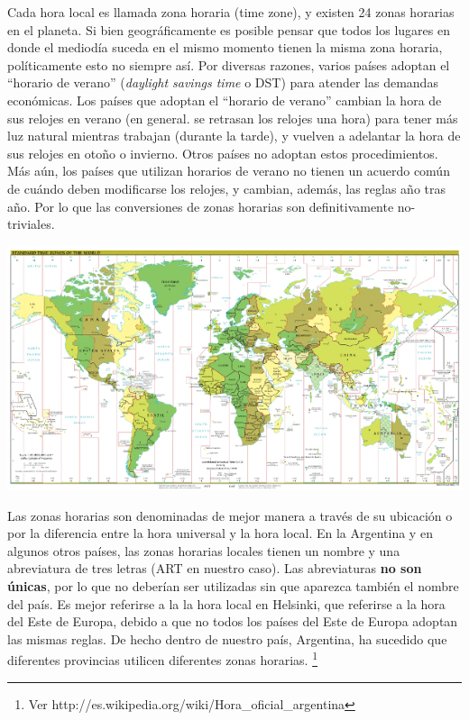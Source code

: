 \documentclass[12pt]{article}
\begin{document}
Cada hora local es llamada zona horaria (time zone), y existen 24 zonas horarias
en el planeta. Si bien geográficamente es posible pensar que todos los lugares
en donde el mediodía suceda en el mismo momento tienen la misma zona horaria,
políticamente esto no siempre así. Por diversas razones, varios países
adoptan el ``horario de verano'' (\textit{daylight savings time} o DST) para atender las demandas
económicas. Los países que adoptan el ``horario de verano'' cambian la hora
de sus relojes en verano (en general. se retrasan los relojes una hora) para
tener más luz natural mientras trabajan (durante la tarde), y vuelven a adelantar
la hora de sus relojes en otoño o invierno. Otros países no adoptan estos procedimientos.
Más aún, los países que utilizan horarios de verano no tienen un acuerdo común de cuándo deben
modificarse los relojes, y cambian, además, las reglas año tras año. Por lo que las
conversiones de zonas horarias son definitivamente no-triviales.

\begin{center}
 \includegraphics{World_Time_Zones_Map.jpg}
\end{center}

Las zonas horarias son denominadas de mejor manera a través de su ubicación o por
la diferencia entre la hora universal y la hora local. En la Argentina y
en algunos otros países, las zonas horarias locales tienen un nombre y una abreviatura
de tres letras (ART en nuestro caso). Las abreviaturas \textbf{no son únicas}, por lo que no deberían
ser utilizadas sin que aparezca también el nombre del país. Es mejor referirse a la
la hora local en Helsinki, que referirse a la hora del Este de Europa, debido a que
no todos los países del Este de Europa adoptan las mismas reglas. De hecho dentro 
de nuestro país, Argentina,  ha sucedido que diferentes provincias utilicen diferentes
zonas horarias. \footnote{Ver http://es.wikipedia.org/wiki/Hora\_oficial\_argentina}
\end{document}
